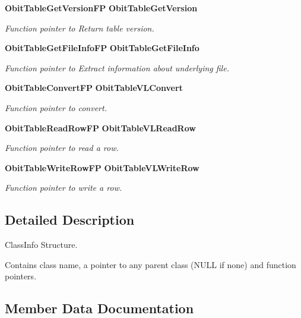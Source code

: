 \begin{CompactItemize}
{\bf Obit\-Table\-Get\-Version\-FP} {\bf Obit\-Table\-Get\-Version}
\begin{CompactList}\small\item\em Function pointer to Return table version. \item\end{CompactList}\item 
{\bf Obit\-Table\-Get\-File\-Info\-FP} {\bf Obit\-Table\-Get\-File\-Info}
\begin{CompactList}\small\item\em Function pointer to Extract information about underlying file. \item\end{CompactList}\item 
{\bf Obit\-Table\-Convert\-FP} {\bf Obit\-Table\-VLConvert}
\begin{CompactList}\small\item\em Function pointer to convert. \item\end{CompactList}\item 
{\bf Obit\-Table\-Read\-Row\-FP} {\bf Obit\-Table\-VLRead\-Row}
\begin{CompactList}\small\item\em Function pointer to read a row. \item\end{CompactList}\item 
{\bf Obit\-Table\-Write\-Row\-FP} {\bf Obit\-Table\-VLWrite\-Row}
\begin{CompactList}\small\item\em Function pointer to write a row. \item\end{CompactList}\end{CompactItemize}


\subsection{Detailed Description}
Class\-Info Structure. 

Contains class name, a pointer to any parent class (NULL if none) and function pointers. 



\subsection{Member Data Documentation}
